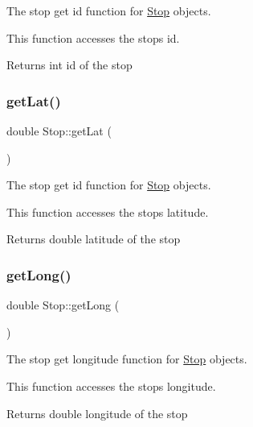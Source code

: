 \begin{figure}[H]
\begin{center}
The stop get id function for \hyperlink{classStop}{Stop} objects. 

This function accesses the stop\textquotesingle{}s id.

\begin{DoxyReturn}{Returns}
int id of the stop 
\end{DoxyReturn}
\mbox{\label{classStop_ad26553052a5ee0c478f4988ec51236d9}} 
\subsubsection{\texorpdfstring{get\+Lat()}{getLat()}}
{\footnotesize\ttfamily double Stop\+::get\+Lat (\begin{DoxyParamCaption}{ }\end{DoxyParamCaption})}



The stop get id function for \hyperlink{classStop}{Stop} objects. 

This function accesses the stop\textquotesingle{}s latitude.

\begin{DoxyReturn}{Returns}
double latitude of the stop 
\end{DoxyReturn}
\mbox{\label{classStop_aea4bfbf489a3a61ecb104e9aa9f613c4}} 
\subsubsection{\texorpdfstring{get\+Long()}{getLong()}}
{\footnotesize\ttfamily double Stop\+::get\+Long (\begin{DoxyParamCaption}{ }\end{DoxyParamCaption})}



The stop get longitude function for \hyperlink{classStop}{Stop} objects. 

This function accesses the stop\textquotesingle{}s longitude.

\begin{DoxyReturn}{Returns}
double longitude of the stop 
\end{DoxyReturn}
\mbox{\label{classStop_a195566d0fb9cc1bcc8929cffd5602052}} 

\end{center}
\end{figure}

